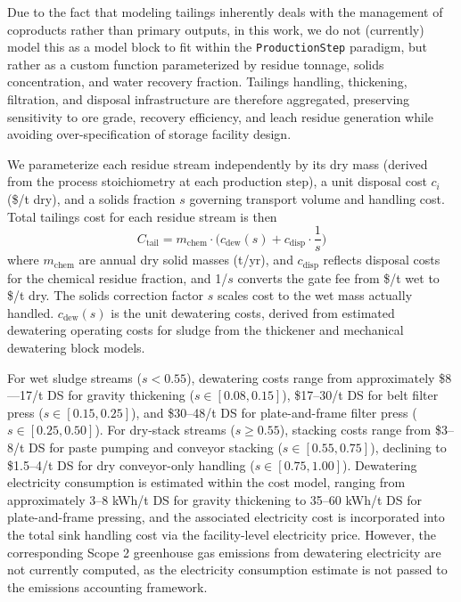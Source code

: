 Due to the fact that modeling tailings inherently deals with the management of coproducts rather than primary outputs, in this work, we do not (currently) model this as a model block to fit within the \texttt{ProductionStep} paradigm, but rather as a custom function parameterized by residue tonnage, solids concentration, and water recovery fraction. Tailings handling, thickening, filtration, and disposal infrastructure are therefore aggregated, preserving sensitivity to ore grade, recovery efficiency, and leach residue generation while avoiding over-specification of storage facility design.

We parameterize each residue stream independently by its dry mass (derived from the process stoichiometry at each production step), a unit disposal cost $c_i$ (\$/t dry), and a solids fraction $s$ governing transport volume and handling cost. Total tailings cost for each residue stream is then
\begin{equation}
    C_{\text{tail}} = m_{\text{chem}} \cdot \Big(c_\text{dew}(s) + c_{\text{disp}} \cdot \frac{1}{s} \Big)
    \label{eq:c-tailings}
\end{equation}
\noindent where $m_{\text{chem}}$ are annual dry solid masses (t/yr), and $c_{\text{disp}}$ reflects disposal costs for the chemical residue fraction, and 1/$s$ converts the gate fee from \$/t wet to \$/t dry. The solids correction factor $s$ scales cost to the wet mass actually handled. $c_\text{dew}(s)$ is the unit dewatering costs, derived from estimated dewatering operating costs for sludge from the thickener and mechanical dewatering block models. 

For wet sludge streams ($s < 0.55$), dewatering costs range from approximately \$8---17/t DS for gravity thickening ($s \in [0.08, 0.15]$), \$17--30/t DS for belt filter press ($s \in [0.15, 0.25]$), and \$30--48/t DS for plate-and-frame filter press ($s \in [0.25, 0.50]$). For dry-stack streams ($s \geq 0.55$), stacking costs range from \$3--8/t DS for paste pumping and conveyor stacking ($s \in [0.55, 0.75]$), declining to \$1.5--4/t DS for dry conveyor-only handling ($s \in [0.75, 1.00]$). Dewatering electricity consumption is estimated within the cost model, ranging from approximately 3--8 kWh/t DS for gravity thickening to 35--60 kWh/t DS for plate-and-frame pressing, and the associated electricity cost is incorporated into the total sink handling cost via the facility-level electricity price. However, the corresponding Scope 2 greenhouse gas emissions from dewatering electricity are not currently computed, as the electricity consumption estimate is not passed to the emissions accounting framework.

